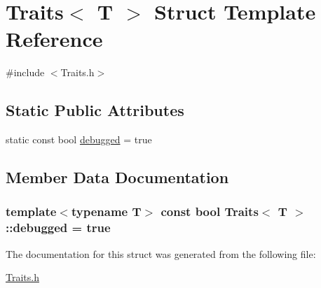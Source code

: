 \hypertarget{struct_traits}{\section{Traits$<$ T $>$ Struct Template Reference}
\label{struct_traits}
}


{\ttfamily \#include $<$Traits.\-h$>$}

\subsection*{Static Public Attributes}
\begin{DoxyCompactItemize}
\item 
static const bool \hyperlink{struct_traits_a0abb19a116800ab778598eed38bad4a0}{debugged} = true
\end{DoxyCompactItemize}


\subsection{Member Data Documentation}
\hypertarget{struct_traits_a0abb19a116800ab778598eed38bad4a0}{
\subsubsection[{debugged}]{\setlength{\rightskip}{0pt plus 5cm}template$<$typename T$>$ const bool {\bf Traits}$<$ T $>$\-::debugged = true\hspace{0.3cm}{\ttfamily [static]}}}\label{struct_traits_a0abb19a116800ab778598eed38bad4a0}


The documentation for this struct was generated from the following file\-:\begin{DoxyCompactItemize}
\item 
\hyperlink{_traits_8h}{Traits.\-h}\end{DoxyCompactItemize}
